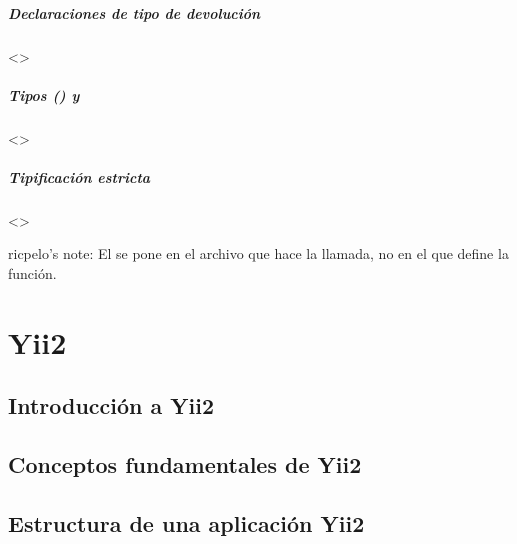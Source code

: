 \documentclass[a4paper,12pt,spanish]{sphinxmanual}
\begin{document}
\subsubsection{Declaraciones de tipo de devolución}
\label{\detokenize{php:declaraciones-de-tipo-de-devolucion}}
\textless{}\textgreater{}


\subsubsection{Tipos  () y }
\label{\detokenize{php:tipos-nullable-y-void}}
\textless{}\textgreater{}


\subsubsection{Tipificación estricta}
\label{\detokenize{php:tipificacion-estricta}}
\textless{}\textgreater{}

ricpelo’s note: El  se pone en el archivo
que hace la llamada, no en el que define la función.


\part{Yii2}
\label{\detokenize{yii2:yii2}}\label{\detokenize{yii2::doc}}

\chapter{Introducción a Yii2}
\label{\detokenize{yii2:introduccion-a-yii2}}

\chapter{Conceptos fundamentales de Yii2}
\label{\detokenize{yii2:conceptos-fundamentales-de-yii2}}

\chapter{Estructura de una aplicación Yii2}
\label{\detokenize{yii2:estructura-de-una-aplicacion-yii2}}
\end{document}
